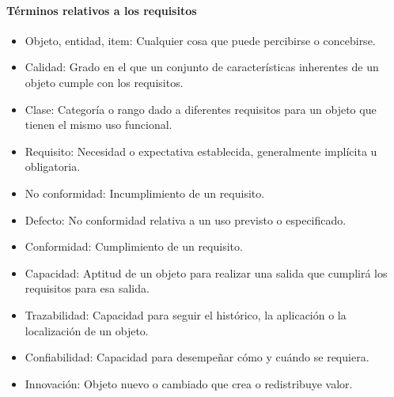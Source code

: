 \newpage
\thispagestyle{plain}
		
		\paragraph{Términos relativos a los requisitos}
			\begin{itemize}
				\item Objeto, entidad, item: Cualquier cosa que puede percibirse o concebirse.
				
				\item Calidad: Grado en el que un conjunto de características inherentes de un objeto cumple con los requisitos.
				
				\item Clase: Categoría o rango dado a diferentes requisitos para un objeto que tienen el mismo uso funcional.
				
				\item Requisito: Necesidad o expectativa establecida, generalmente implícita u obligatoria.
				
				\item No conformidad: Incumplimiento de un requisito.
				
				\item Defecto: No conformidad relativa a un uso previsto o especificado.
				
				\item Conformidad: Cumplimiento de un requisito.
				
				\item Capacidad: Aptitud de un objeto para realizar una salida que cumplirá los requisitos para esa salida.
				
				\item Trazabilidad: Capacidad para seguir el histórico, la aplicación o la localización de un objeto.
				
				\item Confiabilidad: Capacidad para desempeñar cómo y cuándo se requiera.
				
				\item Innovación: Objeto nuevo o cambiado que crea o redistribuye valor.
			\end{itemize}
		
